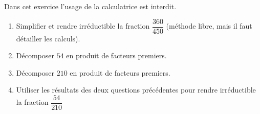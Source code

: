 \begin{minipage}{0.99\linewidth}

\exo

Dans cet exercice l'usage de la calculatrice est interdit.

\begin{enumerate}

\item Simplifier et rendre irréductible la fraction $\dfrac{360}{450}$ (méthode libre, mais il faut détailler les calculs).
\item Décomposer $54$ en produit de facteurs premiers.
\item Décomposer $210$ en produit de facteurs premiers.
\item Utiliser les résultats des deux questions précédentes pour rendre irréductible la fraction $\dfrac{54}{210}$
\end{enumerate}
\end{minipage}

\vspace{0.5cm}
